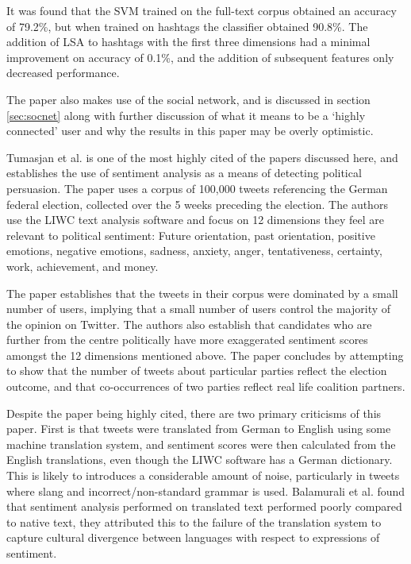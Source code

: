 \documentclass[bsc,frontabs,singlespacing,parskip]{infthesis}     %
\begin{document}
It was found that the SVM trained on the full-text corpus obtained an accuracy of 79.2\%, but when trained on hashtags the classifier obtained 90.8\%. The addition of LSA to hashtags with the first three dimensions had a minimal improvement on accuracy of 0.1\%, and the addition of subsequent features only decreased performance. 

The paper also makes use of the social network, and is discussed in section \ref{sec:socnet} along with further discussion of what it means to be a `highly connected' user and why the results in this paper may be overly optimistic.

Tumasjan et al. \cite{predelections} is one of the most highly cited of the papers discussed here, and establishes the use of sentiment analysis as a means of detecting political persuasion. The paper uses a corpus of 100,000 tweets referencing the German federal election, collected over the 5 weeks preceding the election. The authors use the LIWC text analysis software and focus on 12 dimensions they feel are relevant to political sentiment: Future orientation, past orientation, positive emotions, negative emotions, sadness, anxiety, anger, tentativeness, certainty, work, achievement, and money.

The paper establishes that the tweets in their corpus were dominated by a small number of users, implying that a  small number of users control the majority of the opinion on Twitter. The authors also establish that candidates who are further from the centre politically have more exaggerated sentiment scores amongst the 12 dimensions mentioned above. The paper concludes by attempting to show that the number of tweets about particular parties reflect the election outcome, and that co-occurrences of two parties reflect real life coalition partners. 

Despite the paper being highly cited, there are two primary criticisms of this paper. First is that tweets were translated from German to English using some machine translation system, and sentiment scores were then calculated from the English translations, even though the LIWC software has a German dictionary. This is likely to introduces a considerable amount of noise, particularly in tweets where slang and incorrect/non-standard grammar is used. Balamurali et al. \cite{balamurali2013lost} found that sentiment analysis performed on translated text performed poorly compared to native text, they attributed this to the failure of the translation system to capture cultural divergence between languages with respect to expressions of sentiment.
\end{document}
